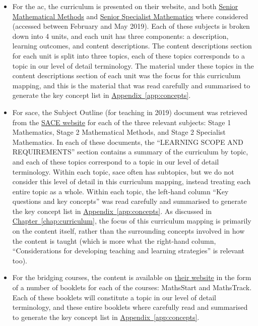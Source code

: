 \documentclass[twoside,12pt,a4paper]{report}
\newcommand{\refchap}[1]{\hyperref[chap:#1]{Chapter~\ref{chap:#1}}}
\newcommand{\refapp}[1]{\hyperref[app:#1]{Appendix~\ref{app:#1}}}
\begin{document}
\begin{itemize}
	\item For the \gls{ac}, the curriculum is presented on their website, and both \href{https://www.australiancurriculum.edu.au/senior-secondary-curriculum/mathematics/mathematical-methods/}{Senior Mathematical Methods} and \href{https://www.australiancurriculum.edu.au/senior-secondary-curriculum/mathematics/specialist-mathematics/}{Senior Specialist Mathematics} where considered (accessed between February and May 2019). Each of these subjects is broken down into 4 units, and each unit has three components: a description, learning outcomes, and content descriptions. The content descriptions section for each unit is split into three topics, each of these topics corresponds to a topic in our level of detail terminology. The material under these topics in the content descriptions section of each unit was the focus for this curriculum mapping, and this is the material that was read carefully and summarised to generate the key concept list in \refapp{concepts}.
	\item For \gls{sace}, the Subject Outline (for teaching in 2019) document was retrieved from the \href{https://www.sace.sa.edu.au/}{SACE website} for each of the three relevant subjects: Stage 1 Mathematics, Stage 2 Mathematical Methods, and Stage 2 Specialist Mathematics. In each of these documents, the ``LEARNING SCOPE AND REQUIREMENTS'' section contains a summary of the curriculum by topic, and each of these topics correspond to a topic in our level of detail terminology. Within each topic, \gls{sace} often has subtopics, but we do not consider this level of detail in this curriculum mapping, instead treating each entire topic as a whole. Within each topic, the left-hand column ``Key questions and key concepts'' was read carefully and summarised to generate the key concept list in \refapp{concepts}. As discussed in \refchap{curriculum}, the focus of this curriculum mapping is primarily on the content itself, rather than the surrounding concepts involved in how the content is taught (which is more what the right-hand column, ``Considerations for developing teaching and learning strategies'' is relevant too). 
	\item For the bridging courses, the content is available on \href{https://www.adelaide.edu.au/mathslearning/bridging/}{their website} in the form of a number of booklets for each of the courses: MathsStart and MathsTrack. Each of these booklets will constitute a topic in our level of detail terminology, and these entire booklets where carefully read and summarised to generate the key concept list in \refapp{concepts}.
\end{itemize}
\end{document}
